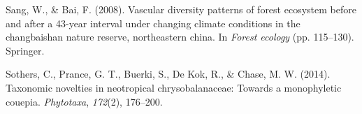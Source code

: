 \documentclass[11pt,]{article}
\begin{document}
\hypertarget{ref-sang2008vascular}{}
Sang, W., \& Bai, F. (2008). Vascular diversity patterns of forest
ecosystem before and after a 43-year interval under changing climate
conditions in the changbaishan nature reserve, northeastern china. In
\emph{Forest ecology} (pp. 115--130). Springer.

\hypertarget{ref-sothers2014taxonomic}{}
Sothers, C., Prance, G. T., Buerki, S., De Kok, R., \& Chase, M. W.
(2014). Taxonomic novelties in neotropical chrysobalanaceae: Towards a
monophyletic couepia. \emph{Phytotaxa}, \emph{172}(2), 176--200.




\newpage
\singlespacing 
\end{document}
